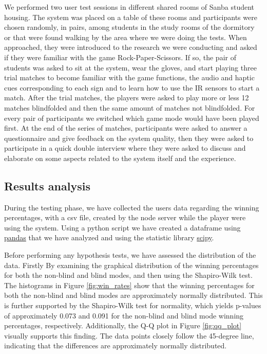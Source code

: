 \documentclass[11pt,a4paper]{report}
\begin{document}
\noindent We performed two user test sessions in different shared rooms of Sanba student housing. The system was placed on a table of these rooms and participants were chosen randomly, in pairs, among students in the study rooms of the dormitory or that were found walking by the area where we were doing the tests. When approached, they were introduced to the research we were conducting and asked if they were familiar with the game Rock-Paper-Scissors. If so, the pair of students was asked to sit at the system, wear the gloves, and start playing three trial matches to become familiar with the game functions, the audio and haptic cues corresponding to each sign and to learn how to use the IR sensors to start a match. After the trial matches, the players were asked to play more or less 12 matches blindfolded and then the same amount of matches not blindfolded. For every pair of participants we switched which game mode would have been played first. At the end of the series of matches, participants were asked to answer a questionnaire and give feedback on the system quality, then they were asked to participate in a quick double interview where they were asked to discuss and elaborate on some aspects related to the system itself and the experience.

\subsection*{Results analysis}
During the testing phase, we have collected the users data regarding the winning percentages, with a csv file, created by the node server while the player were using the system.
Using a python script we have created a dataframe using \href{https://pandas.pydata.org/docs/index.html}{pandas} that we have analyzed and using the statistic library \href{https://www.scipy.org/}{scipy}.

\noindent Before performing any hypothesis tests, we have assessed the distribution of the data.
Firstly By examining the graphical distribution of the winning percentages for both the non-blind and blind modes, and then using the Shapiro-Wilk test.
\noindent The histograms in Figure \ref{fig:win_rates} show that the winning percentages for both the non-blind and blind modes are approximately normally distributed. 
This is further supported by the Shapiro-Wilk test for normality, which yields p-values of approximately 0.073 and 0.091 for the non-blind and blind mode winning percentages, respectively.
Additionally, the Q-Q plot in Figure \ref{fig:qq_plot} visually supports this finding. The data points closely follow the 45-degree line, indicating that the differences are approximately normally distributed.
\end{document}
